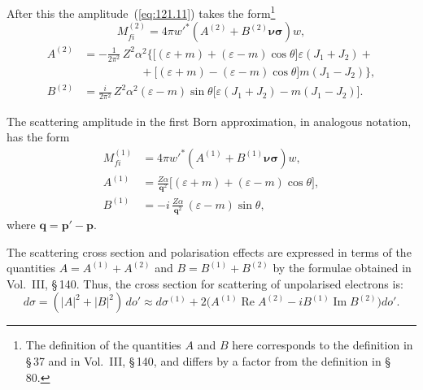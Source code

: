 After this the amplitude~(\ref{eq:121.11}) takes the form\footnote{The definition of the quantities $A$ and $B$ here corresponds to the definition in \S\,37 and in Vol.~III, \S\,140, and differs by a factor from the definition in \S\,80.}
\begin{equation}
M_{fi}^{(2)} = 4\pi w'^{*}(A^{(2)} + B^{(2)}\boldsymbol{\nu\sigma})w,
\label{eq:121.12}
\end{equation}
\begin{equation}
\begin{split}
A^{(2)} &= -\frac{1}{2\pi^2}\,Z^2\alpha^2\bigl\{\bigl[(\varepsilon + m) + (\varepsilon - m)\cos\theta\bigr]\varepsilon(J_1 + J_2) +{}\\
&\qquad\qquad\quad{}+ \bigl[(\varepsilon + m) - (\varepsilon - m)\cos\theta\bigr]m(J_1 - J_2)\bigr\},\\
B^{(2)} &= \frac{i}{2\pi^2}\,Z^2\alpha^2(\varepsilon - m)\sin\theta\bigl[\varepsilon(J_1 + J_2) - m(J_1 - J_2)\bigr].
\end{split}
\label{eq:121.13}
\end{equation}

The scattering amplitude in the first Born approximation, in analogous notation, has the form
\[
\begin{split}
M_{fi}^{(1)} &= 4\pi w'^{*}(A^{(1)} + B^{(1)}\boldsymbol{\nu\sigma})w,\\
A^{(1)} &= \frac{Z\alpha}{\mathbf{q}^2}\bigl[(\varepsilon + m) + (\varepsilon - m)\cos\theta\bigr],\\
B^{(1)} &= -i\,\frac{Z\alpha}{\mathbf{q}^2}\,(\varepsilon - m)\sin\theta,
\end{split}
\]
where $\mathbf{q} = \mathbf{p}' - \mathbf{p}$.

The scattering cross section and polarisation effects are expressed in terms of the quantities $A = A^{(1)} + A^{(2)}$ and $B = B^{(1)} + B^{(2)}$ by the formulae obtained in Vol.~III, \S\,140. Thus, the cross section for scattering of unpolarised electrons is:
\[
d\sigma = (|A|^2 + |B|^2)\,do' \approx d\sigma^{(1)} + 2\bigl(A^{(1)}\operatorname{Re} A^{(2)} - iB^{(1)}\operatorname{Im} B^{(2)}\bigr)do'.
\]


